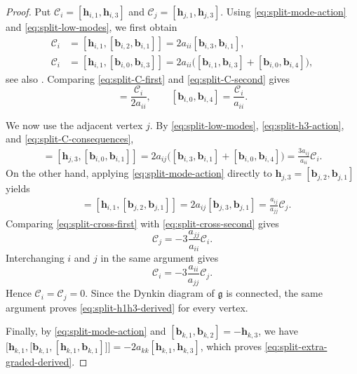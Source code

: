 \documentclass[11pt,reqno]{amsart}
\numberwithin{equation}{section}
\theoremstyle{definition}
\theoremstyle{remark}
\newcommand{\bb}{\mathbf{b}}
\newcommand{\bh}{\mathbf{h}}
\newcommand{\g}{\mathfrak{g}}
\begin{document}
\begin{proof}
Put $\mathscr C_i=[\bh_{i,1},\bh_{i,3}]$ and $\mathscr C_j=[\bh_{j,1},\bh_{j,3}]$. Using \eqref{eq:split-mode-action} and
\eqref{eq:split-low-modes}, we first obtain
\begin{align}
 \mathscr C_i
 &=[\bh_{i,1},[\bb_{i,2},\bb_{i,1}]]
   =2a_{ii}[\bb_{i,3},\bb_{i,1}],
 \label{eq:split-C-first}\\
 \mathscr C_i
 &=[\bh_{i,1},[\bb_{i,0},\bb_{i,3}]]
   =2a_{ii}\bigl(
      [\bb_{i,1},\bb_{i,3}]
      +[\bb_{i,0},\bb_{i,4}]
    \bigr),
 \label{eq:split-C-second}
\end{align}
see also
\cite[(3.35)--(3.36)]{Lu26min}. Comparing
\eqref{eq:split-C-first} and \eqref{eq:split-C-second} gives
\begin{equation}
 [\bb_{i,3},\bb_{i,1}]=\frac{\mathscr C_i}{2a_{ii}} ,
 \qquad
 [\bb_{i,0},\bb_{i,4}]=\frac{\mathscr C_i}{a_{ii}}.
 \label{eq:split-C-consequences}
\end{equation}

We now use the adjacent vertex $j$. By
\eqref{eq:split-low-modes}, \eqref{eq:split-h3-action}, and
\eqref{eq:split-C-consequences},
\begin{align}
 [\bh_{j,3},\bh_{i,1}]
 =[\bh_{j,3},[\bb_{i,0},\bb_{i,1}]]
=2a_{ij}\bigl(
      [\bb_{i,3},\bb_{i,1}]
      +[\bb_{i,0},\bb_{i,4}]
    \bigr)
 =\frac{3a_{ij}}{a_{ii}}\mathscr C_i.
 \label{eq:split-cross-first}
\end{align}
On the other hand, applying \eqref{eq:split-mode-action} directly to
$\bh_{j,3}=[\bb_{j,2},\bb_{j,1}]$ yields
\begin{align}
 [\bh_{i,1},\bh_{j,3}]
 &=[\bh_{i,1},[\bb_{j,2},\bb_{j,1}]]
 =2a_{ij}[\bb_{j,3},\bb_{j,1}]
 =\frac{a_{ij}}{a_{jj}}\mathscr C_j.
 \label{eq:split-cross-second}
\end{align}
Comparing \eqref{eq:split-cross-first}  with
\eqref{eq:split-cross-second} gives
\begin{equation*}
\mathscr C_j=-3\frac{a_{jj}}{a_{ii}}\mathscr C_i.
\end{equation*}
Interchanging $i$ and $j$ in the same argument gives
\begin{equation*}
\mathscr C_i=-3\frac{a_{ii}}{a_{jj}}\mathscr C_j.
\end{equation*}
Hence $\mathscr C_i= \mathscr C_j=0$. Since the Dynkin diagram of $\g$ is connected, the same
argument proves \eqref{eq:split-h1h3-derived} for every vertex.

Finally, by \eqref{eq:split-mode-action} and
$[\bb_{k,1},\bb_{k,2}]=-\bh_{k,3}$, we have $\big[\bh_{k,1},
   \big[\bb_{k,1},[\bh_{k,1},\bb_{k,1}]\big]
 \big]
 =-2a_{kk}[\bh_{k,1},\bh_{k,3}]$, which proves \eqref{eq:split-extra-graded-derived}.
\end{proof}
\end{document}
